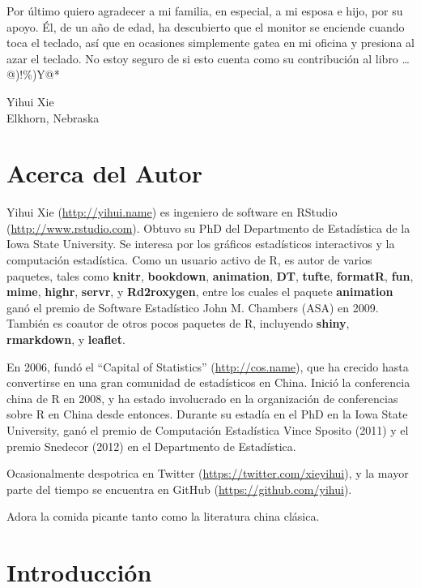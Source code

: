 \documentclass[12pt,]{krantz}
\theoremstyle{definition}
\theoremstyle{definition}
\theoremstyle{definition}
\theoremstyle{remark}
\let\BeginKnitrBlock\begin \let\EndKnitrBlock\end
\begin{document}
Por último quiero agradecer a mi familia, en especial, a mi esposa e
hijo, por su apoyo. Él, de un año de edad, ha descubierto que el monitor
se enciende cuando toca el teclado, así que en ocasiones simplemente
gatea en mi oficina y presiona al azar el teclado. No estoy seguro de si
esto cuenta como su contribución al libro \ldots{} @)!\%)Y@*

\BeginKnitrBlock{flushright}
Yihui Xie\\
Elkhorn, Nebraska
\EndKnitrBlock{flushright}

\chapter*{Acerca del Autor}\label{acerca-del-autor}


Yihui Xie (\url{http://yihui.name}) es ingeniero de software en RStudio
(\url{http://www.rstudio.com}). Obtuvo su PhD del Departmento de
Estadística de la Iowa State University. Se interesa por los gráficos
estadísticos interactivos y la computación estadística. Como un usuario
activo de R, es autor de varios paquetes, tales como \textbf{knitr},
\textbf{bookdown}, \textbf{animation}, \textbf{DT}, \textbf{tufte},
\textbf{formatR}, \textbf{fun}, \textbf{mime}, \textbf{highr},
\textbf{servr}, y \textbf{Rd2roxygen}, entre los cuales el paquete
\textbf{animation} ganó el premio de Software Estadístico John M.
Chambers (ASA) en 2009. También es coautor de otros pocos paquetes de R,
incluyendo \textbf{shiny}, \textbf{rmarkdown}, y \textbf{leaflet}.

En 2006, fundó el ``Capital of Statistics'' (\url{http://cos.name}), que
ha crecido hasta convertirse en una gran comunidad de estadísticos en
China. Inició la conferencia china de R en 2008, y ha estado involucrado
en la organización de conferencias sobre R en China desde entonces.
Durante su estadía en el PhD en la Iowa State University, ganó el premio
de Computación Estadística Vince Sposito (2011) y el premio Snedecor
(2012) en el Departmento de Estadística.

Ocasionalmente despotrica en Twitter
(\url{https://twitter.com/xieyihui}), y la mayor parte del tiempo se
encuentra en GitHub (\url{https://github.com/yihui}).

Adora la comida picante tanto como la literatura china clásica.

\mainmatter

\chapter{Introducción}\label{introduccion}
\end{document}
